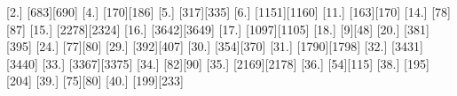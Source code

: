 [2.] [683][690]
[4.] [170][186]
[5.] [317][335]
[6.] [1151][1160]
[11.] [163][170]
[14.] [78][87]
[15.] [2278][2324]
[16.] [3642][3649]
[17.] [1097][1105]
[18.] [9][48]
[20.] [381][395]
[24.] [77][80]
[29.] [392][407]
[30.] [354][370]
[31.] [1790][1798]
[32.] [3431][3440]
[33.] [3367][3375]
[34.] [82][90]
[35.] [2169][2178]
[36.] [54][115]
[38.] [195][204]
[39.] [75][80]
[40.] [199][233]
